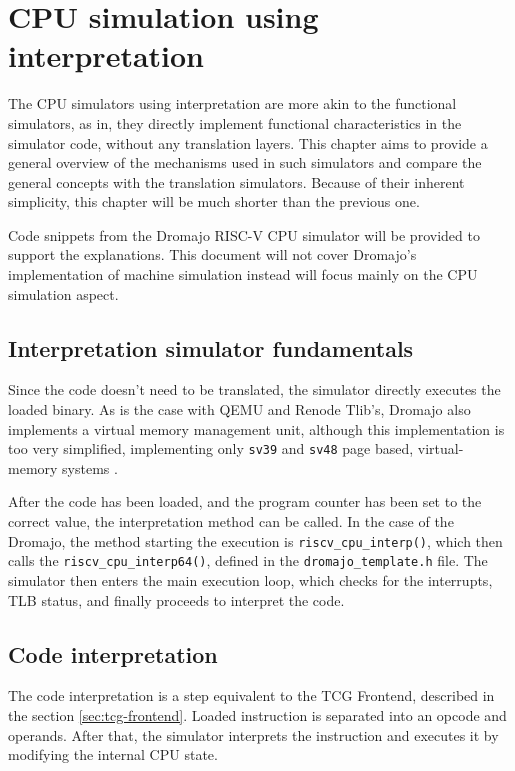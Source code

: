 
\chapter{CPU simulation using interpretation}

The CPU simulators using interpretation are more akin to the functional simulators, as in, they directly implement
functional characteristics in the simulator code, without any translation layers. This chapter aims to provide a
general overview of the mechanisms used in such simulators and compare the general concepts with the translation
simulators. Because of their inherent simplicity, this chapter will be much shorter than the previous one.

Code snippets from the Dromajo RISC-V CPU simulator will be provided to support the explanations. This document will not
cover Dromajo's implementation of machine simulation instead will focus mainly on the CPU simulation aspect.

\section*{Interpretation simulator fundamentals}

Since the code doesn't need to be translated, the simulator directly executes the loaded binary. As is the case with
QEMU and Renode Tlib's, Dromajo also implements a virtual memory management unit, although this implementation is too
very simplified, implementing only \texttt{sv39} and \texttt{sv48} page based, virtual-memory systems \cite{RISC-PRIV}.

After the code has been loaded, and the program counter has been set to the correct value, the interpretation method
can be called. In the case of the Dromajo, the method starting the execution is \texttt{riscv\_cpu\_interp()}, which
then calls the \texttt{riscv\_cpu\_interp64()}, defined in the \texttt{dromajo\_template.h} file. The simulator then
enters the main execution loop, which checks for the interrupts, TLB status, and finally proceeds to interpret the code.

\section{Code interpretation}

The code interpretation is a step equivalent to the TCG Frontend, described in the section \ref{sec:tcg-frontend}.
Loaded instruction is separated into an opcode and operands. After that, the simulator interprets the instruction
and executes it by modifying the internal CPU state.

